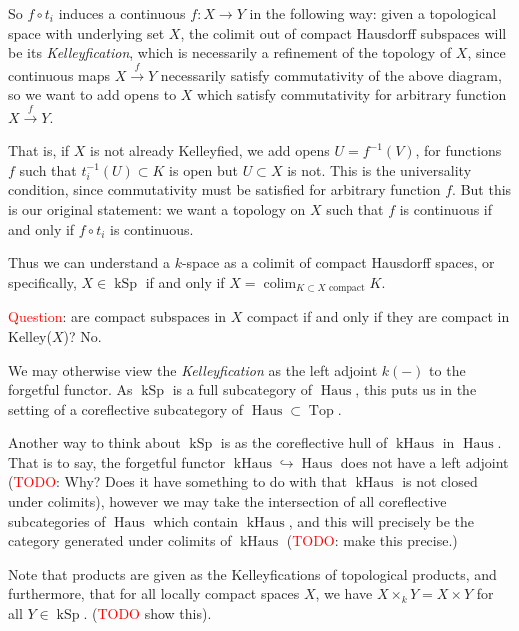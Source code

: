 \documentclass[12pt,a4paper]{article}
\DeclareMathOperator{\colim}{colim}
\DeclareMathOperator{\Top}{Top}
\DeclareMathOperator{\kSp}{kSp}
\DeclareMathOperator{\kHaus}{kHaus}
\DeclareMathOperator{\Haus}{Haus}
\begin{document}
So $f \circ t_i$ induces a continuous $f: X \to Y$ in the following way: given a topological space with underlying set  $X$, the colimit out of compact Hausdorff subspaces will be its \emph{Kelleyfication}, which is necessarily a refinement of the topology of $X$, since continuous maps $X \stackrel{f}{\to}Y$ necessarily satisfy commutativity of the above diagram, so we want to add opens to $X$ which satisfy commutativity for arbitrary function $X \stackrel{f}{\to}Y$. 



That is, if $X$ is not already Kelleyfied, we add opens $U = f^{-1}(V)$, for functions $f$ such that  $t_i^{-1}(U) \subset K$ is open  but $U \subset X$ is not. This is the universality condition, since commutativity must be satisfied for arbitrary function $f$. But this is our original statement: we want a topology on $X$ such that $f$ is continuous if and only if $f \circ t_i$ is continuous. 

Thus we can understand a $k$-space as a colimit of compact Hausdorff spaces, or specifically, $X \in \kSp$ if and only if $X = \colim_{K \subset X \text{ compact}}K$.

\textcolor{red}{Question}: are compact subspaces in $X$ compact if and only if they are compact in Kelley($X$)? No.

We may otherwise view the \emph{Kelleyfication} as the left adjoint $k(-)$ to the forgetful functor. As $\kSp$ is a full subcategory of $\Haus$, this puts us in the setting of a coreflective subcategory of $\Haus \subset \Top$. 

Another way to think about $\kSp$ is as the coreflective hull of $\kHaus$ in $\Haus$. That is to say, the forgetful functor $\kHaus \hookrightarrow \Haus$ does not have a left adjoint (\textcolor{red}{TODO}: Why? Does it have something to do with that $\kHaus$ is not closed under colimits), however we may take the intersection of all coreflective subcategories of $\Haus$ which contain $\kHaus$, and this will precisely be the category generated under colimits of $\kHaus$  (\textcolor{red}{TODO}: make this precise.)

Note that products are given as the Kelleyfications of topological  products, and furthermore, that for all locally compact spaces $X$, we have $X \times_k Y = X \times Y$ for all $Y \in \kSp$. (\textcolor{red}{TODO} show this).
\end{document}
